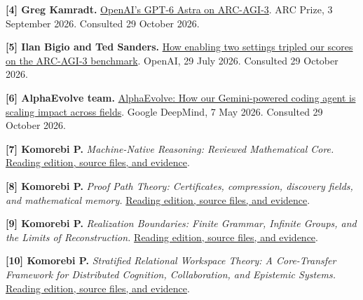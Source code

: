\documentclass[11pt,oneside,openany]{book}
\begin{document}
\hypertarget{reference-4}{}
\textbf{[4] Greg Kamradt.} \href{https://arcprize.org/blog/astra}{OpenAI's GPT-6 Astra on ARC-AGI-3}. ARC Prize, 3 September 2026. Consulted 29 October 2026.

\hypertarget{reference-5}{}
\textbf{[5] Ilan Bigio and Ted Sanders.} \href{https://openai.com/index/how-two-settings-tripled-our-arc-agi-3-scores/}{How enabling two settings tripled our scores on the ARC-AGI-3 benchmark}. OpenAI, 29 July 2026. Consulted 29 October 2026.

\hypertarget{reference-6}{}
\textbf{[6] AlphaEvolve team.} \href{https://deepmind.google/blog/alphaevolve-impact/}{AlphaEvolve: How our Gemini-powered coding agent is scaling impact across fields}. Google DeepMind, 7 May 2026. Consulted 29 October 2026.

\hypertarget{reference-7}{}
\textbf{[7] Komorebi P.} \emph{Machine-Native Reasoning: Reviewed Mathematical Core.} \href{https://komorebip.github.io/Operation-KOMOREBI/collection/works/monographs-machine-native-reasoning.html}{Reading edition, source files, and evidence}.

\hypertarget{reference-8}{}
\textbf{[8] Komorebi P.} \emph{Proof Path Theory: Certificates, compression, discovery fields, and mathematical memory.} \href{https://komorebip.github.io/Operation-KOMOREBI/collection/works/proof-path-theory.html}{Reading edition, source files, and evidence}.

\hypertarget{reference-9}{}
\textbf{[9] Komorebi P.} \emph{Realization Boundaries: Finite Grammar, Infinite Groups, and the Limits of Reconstruction.} \href{https://komorebip.github.io/Operation-KOMOREBI/collection/works/realization-boundaries.html}{Reading edition, source files, and evidence}.

\hypertarget{reference-10}{}
\textbf{[10] Komorebi P.} \emph{Stratified Relational Workspace Theory: A Core-Transfer Framework for Distributed Cognition, Collaboration, and Epistemic Systems.} \href{https://komorebip.github.io/Operation-KOMOREBI/collection/works/research-stratified-relational-workspace.html}{Reading edition, source files, and evidence}.
\end{document}
